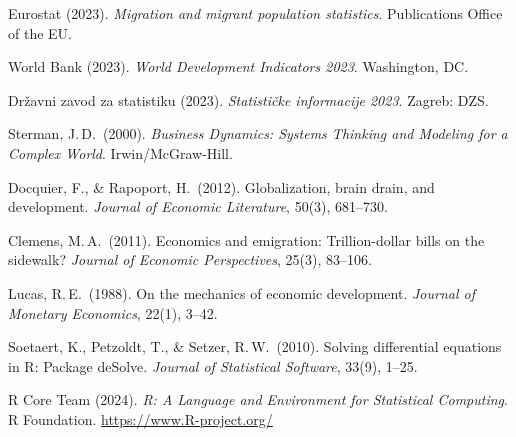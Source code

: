 \documentclass[11pt,a4paper]{article}
\begin{document}
\begin{enumerate}[leftmargin=1.6em, label={[\arabic*]}, noitemsep, topsep=3pt]
  \item Eurostat (2023). \textit{Migration and migrant population statistics}. Publications Office of the EU.
  \item World Bank (2023). \textit{World Development Indicators 2023}. Washington, DC.
  \item Državni zavod za statistiku (2023). \textit{Statističke informacije 2023}. Zagreb: DZS.
  \item Sterman, J.\,D.\ (2000). \textit{Business Dynamics: Systems Thinking and Modeling for a Complex World}. Irwin/McGraw-Hill.
  \item Docquier, F., \& Rapoport, H.\ (2012). Globalization, brain drain, and development. \textit{Journal of Economic Literature}, 50(3), 681–730.
  \item Clemens, M.\,A.\ (2011). Economics and emigration: Trillion-dollar bills on the sidewalk? \textit{Journal of Economic Perspectives}, 25(3), 83–106.
  \item Lucas, R.\,E.\ (1988). On the mechanics of economic development. \textit{Journal of Monetary Economics}, 22(1), 3–42.
  \item Soetaert, K., Petzoldt, T., \& Setzer, R.\,W.\ (2010). Solving differential equations in R: Package deSolve. \textit{Journal of Statistical Software}, 33(9), 1–25.
  \item R Core Team (2024). \textit{R: A Language and Environment for Statistical Computing}. R Foundation. \url{https://www.R-project.org/}
\end{enumerate}
\end{document}
